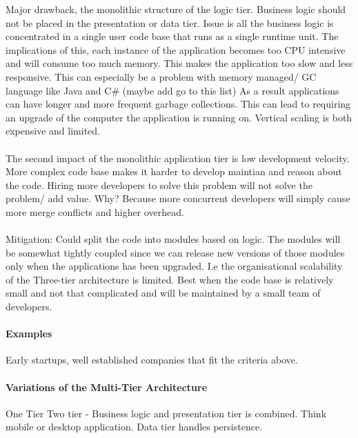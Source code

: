 \documentclass[a4paper, 11pt]{book}
\begin{document}
    Major drawback, the monolithic structure of the logic tier.
    Business logic should not be placed in the presentation or data tier.
    Issue is all the business logic is concentrated in a single user code base that runs as a single runtime unit.
    The implications of this, each instance of the application becomes too CPU intensive and will consume too much memory.
    This makes the application too slow and less responsive.
    This can especially be a problem with memory managed/ GC language like Java and C\# (maybe add go to this list)
    As a result applications can have longer and more frequent garbage collections.
    This can lead to requiring an upgrade of the computer the application is running on.
    Vertical scaling is both expensive and limited.

    \paragraph{}
    The second impact of the monolithic application tier is low development velocity.
    More complex code base makes it harder to develop maintian and reason about the code.
    Hiring more developers to solve this problem will not solve the problem/ add value.
    Why?
    Because more concurrent developers will simply cause more merge conflicts and higher overhead.

    \paragraph{}
    Mitigation: Could split the code into modules based on logic.
    The modules will be somewhat tightly coupled since we can release new versions of those modules only when the applications has been upgraded.
    I.e the organisational scalability of the Three-tier architecture is limited.
    Best when the code base is relatively small and not that complicated and will be maintained by a small team of developers.

    \paragraph{Examples}
    Early startups, well established companies that fit the criteria above.

    \paragraph{Variations of the Multi-Tier Architecture}
    One Tier
    Two tier - Business logic and presentation tier is combined.
    Think mobile or desktop application.
    Data tier handles persistence.
\end{document}
